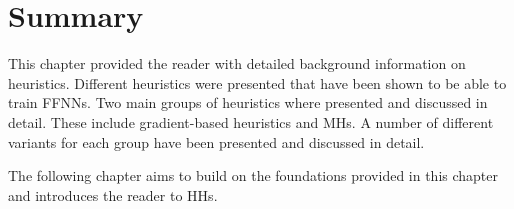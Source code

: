 \section{Summary}
\label{sec:heuristics:summary}

This chapter provided the reader with detailed background information on heuristics. Different heuristics were presented that have been shown to be able to train \acp{FFNN}. Two main groups of heuristics where presented and discussed in detail. These include gradient-based heuristics and \acfp{MH}. A number of different variants for each group have been presented and discussed in detail.

The following chapter aims to build on the foundations provided in this chapter and introduces the reader to \acfp{HH}.
